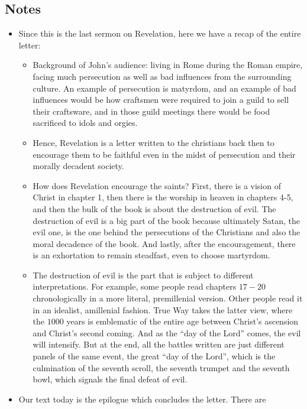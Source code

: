\subsection*{Notes}
\begin{itemize}
  \item{Since this is the last sermon on Revelation, here we have a recap of
  the entire letter:
  \begin{itemize}
    \item{Background of John's audience: living in Rome during the Roman
    empire, facing much persecution as well as bad influences from the
    surrounding culture. An example of persecution is matyrdom, and an
    example of bad influences would be how craftsmen were required to join a
    guild to sell their craftsware, and in those guild meetings there would
    be food sacrificed to idols and orgies.}
    \item{Hence, Revelation is a letter written to the christians back then
    to encourage them to be faithful even in the midst of persecution and
    their morally decadent society.}
    \item{How does Revelation encourage the saints? First, there is a vision
    of Christ in chapter 1, then there is the worship in heaven in chapters
    4-5, and then the bulk of the book is about the destruction of evil. The
    destruction of evil is a big part of the book because ultimately Satan,
    the evil one, is the one behind the persecutions of the Christians and
    also the moral decadence of the book. And lastly, after the
    encouragement, there is an exhortation to remain steadfast, even to
    choose martyrdom.}
    \item{The destruction of evil is the part that is subject to different
    interpretations. For example, some people read chapters $17-20$
    chronologically in a more literal, premillenial version. Other people
    read it in an idealist, amillenial fashion. True Way takes the latter
    view, where the $1000$ years is emblematic of the entire age between
    Christ's ascension and Christ's second coming. And as the ``day of the
    Lord'' comes, the evil will intensify. But at the end, all the battles
    written are just different panels of the same event, the great ``day of
    the Lord'', which is the culmination of the seventh scroll, the seventh
    trumpet and the seventh bowl, which signals the final defeat of evil. }
  \end{itemize}}
  \item{Our text today is the epilogue which concludes the letter. There are
}
\end{itemize}
